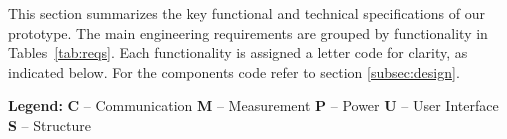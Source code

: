 \documentclass{article}
\begin{document}
This section summarizes the key functional and technical specifications of our prototype.  
The main engineering requirements are grouped by functionality in Tables~\ref{tab:reqs}.  
Each functionality is assigned a letter code for clarity, as indicated below. For the components code refer to section \ref{subsec:design}.

\vspace{0.3cm}

\noindent\textbf{Legend:}  
\textcolor{cyan!60!black}{\textbf{C}} – Communication \hspace{0.8cm}
\textcolor{orange!90!black}{\textbf{M}} – Measurement \hspace{0.8cm}
\textcolor{green!60!black}{\textbf{P}} – Power \hspace{0.8cm}
\textcolor{violet!70!black}{\textbf{U}} – User Interface \hspace{0.8cm}
\textcolor{gray!70!black}{\textbf{S}} – Structure


\renewcommand{\arraystretch}{1.2}
\setlength{\tabcolsep}{3pt}
\setlength\LTleft{0pt}
\setlength\LTright{0pt}
\end{document}
